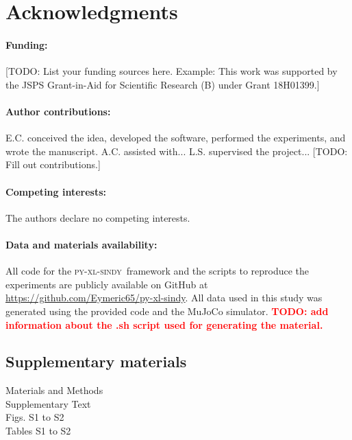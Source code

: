 \documentclass[12pt]{article}
\newcommand{\frameworkname}{\textsc{py-xl-sindy}}
\newcommand{\TODO}[1]{\textbf{\textcolor{red}{\Large TODO: \normalsize #1}}}
\begin{document}

\clearpage %





\section*{Acknowledgments}
\paragraph*{Funding:}
[TODO: List your funding sources here. Example: This work was supported by the JSPS Grant-in-Aid for Scientific Research (B) under Grant 18H01399.]
\paragraph*{Author contributions:}
E.C. conceived the idea, developed the software, performed the experiments, and wrote the manuscript. A.C. assisted with... L.S. supervised the project... [TODO: Fill out contributions.]
\paragraph*{Competing interests:}
The authors declare no competing interests.
\paragraph*{Data and materials availability:}
All code for the \frameworkname\ framework and the scripts to reproduce the experiments are publicly available on GitHub at \url{https://github.com/Eymeric65/py-xl-sindy}. All data used in this study was generated using the provided code and the MuJoCo simulator. \TODO{ add information about the .sh script used for generating the material.}



\subsection*{Supplementary materials}
Materials and Methods\\
Supplementary Text\\
Figs. S1 to S2\\
Tables S1 to S2\\
\end{document}
